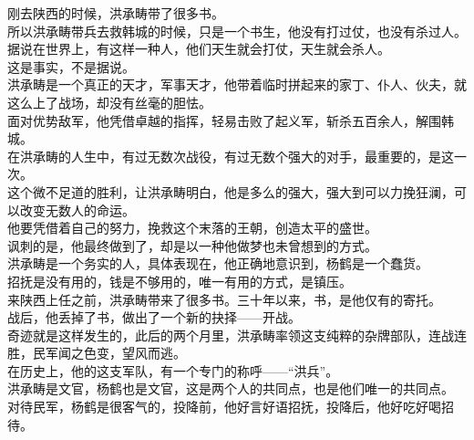 \begin{multicols}{\theparacolNo}
刚去陕西的时候，洪承畴带了很多书。\\

所以洪承畴带兵去救韩城的时候，只是一个书生，他没有打过仗，也没有杀过人。\\

据说在世界上，有这样一种人，他们天生就会打仗，天生就会杀人。\\

这是事实，不是据说。\\

洪承畴是一个真正的天才，军事天才，他带着临时拼起来的家丁、仆人、伙夫，就这么上了战场，却没有丝毫的胆怯。\\

面对优势敌军，他凭借卓越的指挥，轻易击败了起义军，斩杀五百余人，解围韩城。\\

在洪承畴的人生中，有过无数次战役，有过无数个强大的对手，最重要的，是这一次。\\

这个微不足道的胜利，让洪承畴明白，他是多么的强大，强大到可以力挽狂澜，可以改变无数人的命运。\\

他要凭借着自己的努力，挽救这个末落的王朝，创造太平的盛世。\\

讽刺的是，他最终做到了，却是以一种他做梦也未曾想到的方式。\\

洪承畴是一个务实的人，具体表现在，他正确地意识到，杨鹤是一个蠢货。\\

招抚是没有用的，钱是不够用的，唯一有用的方式，是镇压。\\

来陕西上任之前，洪承畴带来了很多书。三十年以来，书，是他仅有的寄托。\\

战后，他丢掉了书，做出了一个新的抉择——开战。\\

奇迹就是这样发生的，此后的两个月里，洪承畴率领这支纯粹的杂牌部队，连战连胜，民军闻之色变，望风而逃。\\

在历史上，他的这支军队，有一个专门的称呼——“洪兵”。\\

洪承畴是文官，杨鹤也是文官，这是两个人的共同点，也是他们唯一的共同点。\\

对待民军，杨鹤是很客气的，投降前，他好言好语招抚，投降后，他好吃好喝招待。\\


\end{multicols}
